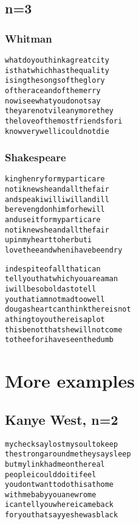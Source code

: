 \documentclass[10pt,twocolumn]{article}
\begin{document}
\begin{appendices}
\subsection{n=3}
\subsubsection{Whitman}
\begin{alltt}
what do you think a great city
is that which has the quality
i sing the songs of the glory
of the race and of the merry
now i see what you do not say
they are not vile any more they
the love of the most friends for i
know very well i could not die
\end{alltt}

\subsubsection{Shakespeare}
\begin{alltt}
king henry for my part i care
not i knew she and all the fair
and speak i will i will and ill
be revengd on him for he will
and use it for my part i care
not i knew she and all the fair
up in my heart to her but i
love thee and when i have been dry
\end{alltt}

\begin{alltt}
in despite of all that i can
tell you that which you are a man
i will be so bold as to tell
you that i am not mad too well
doug as heart can think there is not
a thing to you there is a plot
this be not that she will not come
to thee for i have seen the dumb
\end{alltt}
\newpage
\section{More examples}
\subsection{Kanye West, n=2}
\begin{alltt}
my check say lost my soul to keep
the strong around me they say sleep
but my link had me on the real
people i could do it i feel
you dont want to do this at home
with me baby you a new rome
i can tell you where i came back
for you that say yes he was black
\end{alltt}


\end{appendices}
\end{document}
